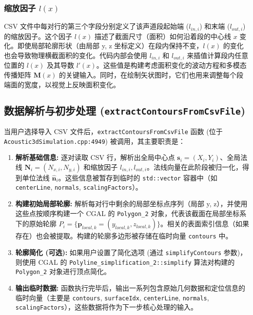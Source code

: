 \documentclass{ctexart}
\begin{document}
\subsubsection{缩放因子 \(l(x)\)}
CSV 文件中每对行的第三个字段分别定义了该声道段起始端 (\(l_{in,i}\)) 和末端 (\(l_{out,i}\)) 的缩放因子。这个因子 \(l(x)\) 描述了截面尺寸（面积）如何沿着段的中心线 \(x\) 变化。即使局部轮廓形状（由局部 y, z 坐标定义）在段内保持不变，\(l(x)\) 的变化也会导致物理横截面积的变化。代码内部会使用 \(l_{in,i}\) 和 \(l_{out,i}\) 来插值计算段内任意位置的 \(l(x)\) 及其导数 \(l'(x)\)。这些值是构建考虑面积变化的波动方程和多模态传播矩阵 \(\mathbf{M}(x)\) 的关键输入。同时，在绘制矢状图时，它们也用来调整每个段端面的宽度，以视觉上反映面积变化。

\subsection{数据解析与初步处理 (\texttt{extractContoursFromCsvFile})}

当用户选择导入 CSV 文件后，\texttt{extractContoursFromCsvFile} 函数 (位于 \texttt{Acoustic3dSimulation.cpp:4949}) 被调用，其主要职责是：
\begin{enumerate}
    \item \textbf{解析基础信息:} 逐对读取 CSV 行，解析出全局中心点 \(\mathbf{s}_i = (X_i, Y_i)\)、全局法线 \(\mathbf{N}_i = (N_{x,i}, N_{y,i})\) 和缩放因子 \(l_{in,i}, l_{out,i}\)。法线向量在此阶段被归一化，得到单位法线 \(\hat{\mathbf{n}}_i\)。这些信息被暂存到临时的 \texttt{std::vector} 容器中（如 \texttt{centerLine}, \texttt{normals}, \texttt{scalingFactors}）。
    \item \textbf{构建初始局部轮廓:} 解析每对行中剩余的局部坐标点序列（局部 y, z），并使用这些点按顺序构建一个 CGAL 的 \texttt{Polygon\_2} 对象，代表该截面在局部坐标系下的原始轮廓 \(P_i = \{\mathbf{p}_{local, k} = (y_{local, k}, z_{local, k})\}\)。相关的表面索引信息（如果存在）也会被提取。构建的轮廓多边形被存储在临时向量 \texttt{contours} 中。
    \item \textbf{轮廓简化 (可选):} 如果用户设置了简化选项 (通过 \texttt{simplifyContours} 参数)，则使用 CGAL 的 \texttt{Polyline\_simplification\_2::simplify} 算法对构建的 \texttt{Polygon\_2} 对象进行顶点简化。
    \item \textbf{输出临时数据:} 函数执行完毕后，输出一系列包含原始几何数据和定位信息的临时向量（主要是 \texttt{contours}, \texttt{surfaceIdx}, \texttt{centerLine}, \texttt{normals}, \texttt{scalingFactors}），这些数据将作为下一步核心处理的输入。
\end{enumerate}
\end{document}
